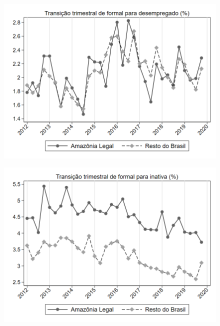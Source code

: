 \begin{frame}[label=_transicao_ocupacao_sh_formal_sh_desempregado]{}
\textit{\hyperlink{_transicao_ocupacao}{}}
\begin{figure}
  \centering
  \includegraphics[width=1.0\linewidth]{../../analysis/output/transicao_ocupacao/_transicao_ocupacao_sh_formal_sh_desempregado.png}
  \caption{}
  \label{fig:_transicao_ocupacao_sh_formal_sh_desempregado}
\end{figure}
\end{frame}


\begin{frame}[label=_transicao_ocupacao_sh_formal_sh_inativa]{}
\textit{\hyperlink{_transicao_ocupacao}{}}
\begin{figure}
  \centering
  \includegraphics[width=1.0\linewidth]{../../analysis/output/transicao_ocupacao/_transicao_ocupacao_sh_formal_sh_inativa.png}
  \caption{}
  \label{fig:_transicao_ocupacao_sh_formal_sh_inativa}
\end{figure}
\end{frame}

